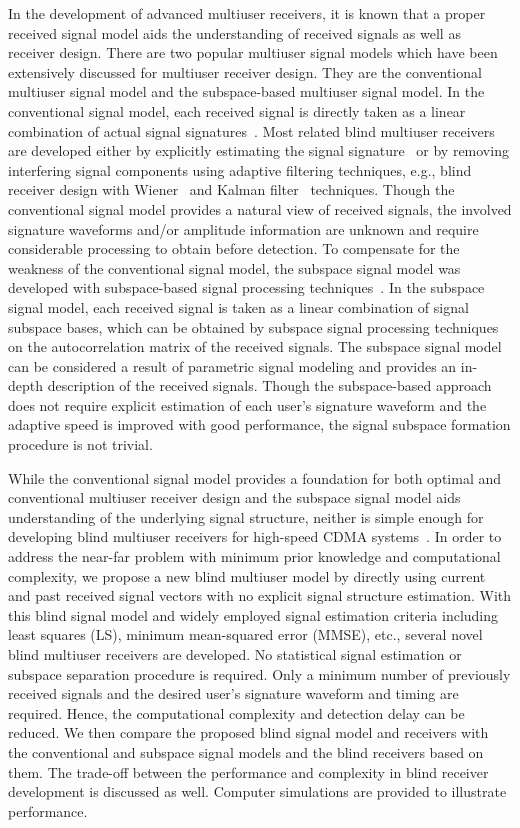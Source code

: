 \documentclass[conference]{IEEEtran}
\begin{document}
In the development of advanced multiuser receivers, it is
known that a proper received signal model aids the understanding of
received signals as well as receiver design. There are two popular
multiuser signal models which have been extensively discussed for
multiuser receiver design. They are the conventional multiuser
signal model and the subspace-based multiuser signal model. In the
conventional signal model, each received signal is directly taken
as a linear combination of actual signal
signatures~\cite{Verd98,Honi95,Zhang02}.  Most related blind
multiuser receivers are developed either by explicitly estimating
the signal signature~\cite{Torl97} or by removing interfering
signal components using adaptive filtering techniques, e.g.,
blind receiver design with Wiener~\cite{Honi95} and Kalman
filter~\cite{Zhang02} techniques.  Though the conventional signal
model provides a natural view of received signals, the involved
signature waveforms and/or amplitude information are unknown and require considerable processing to obtain before detection.  To compensate for
the weakness of the conventional signal model, the subspace signal model was developed with subspace-based signal processing techniques~\cite{Wang98}. In the
subspace signal model, each received signal is taken as a linear
combination of signal subspace bases, which can be obtained by
subspace signal processing techniques on the autocorrelation
matrix of the received signals.  The subspace signal model can be considered a
result of parametric signal modeling and provides an in-depth
description of the received signals. Though the subspace-based
approach does not require explicit estimation of each user's
signature waveform and the adaptive speed is improved
with good performance, the signal subspace formation procedure
is not trivial.

While the conventional signal model provides a foundation for both
optimal and conventional multiuser receiver design and the subspace
signal model aids understanding of the underlying signal structure, neither
is simple enough for developing blind multiuser receivers for high-speed CDMA
systems~\cite{Andr05}. In order to address the near-far problem with
minimum prior knowledge and computational complexity, we propose a
new blind multiuser model by directly using current and past
received signal vectors with no explicit signal structure estimation.
With this blind signal model and widely employed signal estimation criteria including least squares (LS), minimum mean-squared error (MMSE), etc., several novel blind multiuser receivers are
developed. No statistical signal estimation or subspace
separation procedure is required. Only a minimum number of previously
received signals and the desired user's signature waveform
and timing are required. Hence, the computational complexity and
detection delay can be reduced.  We then compare the proposed blind
signal model and receivers with the conventional and subspace signal
models and the blind receivers based on them.  The trade-off between the performance and complexity in blind receiver development is discussed as well.  Computer simulations are provided to illustrate performance.
\end{document}
